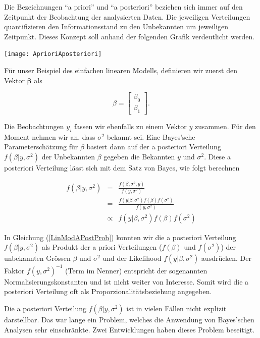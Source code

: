 \documentclass[]{book}
\begin{document}
Die Bezeichnungen ``a priori'' und ``a posteriori'' beziehen sich immer
auf den Zeitpunkt der Beobachtung der analysierten Daten. Die jeweiligen
Verteilungen quantifizieren den Informationsstand zu den Unbekannten um
jeweiligen Zeitpunkt. Dieses Konzept soll anhand der folgenden Grafik
verdeutlicht werden.

\begin{center}\texttt{[image: AprioriAposteriori]} \end{center}

Für unser Beispiel des einfachen linearen Modells, definieren wir zuerst
den Vektor \(\mathbf{\beta}\) als

\[\beta = \left[\begin{array}{c} \beta_0  \\  \beta_1 \end{array} \right].\]

Die Beobachtungen \(y_i\) fassen wir ebenfalls zu einem Vektor \(y\)
zusammen. Für den Moment nehmen wir an, dass \(\sigma^2\) bekannt sei.
Eine Bayes'sche Parameterschätzung für \(\beta\) basiert dann auf der a
posteriori Verteilung \(f(\beta | y, \sigma^2)\) der Unbekannten
\(\beta\) gegeben die Bekannten \(y\) und \(\sigma^2\). Diese a
posteriori Verteilung lässt sich mit dem Satz von Bayes, wie folgt
berechnen

\begin{eqnarray}
f(\beta | y, \sigma^2) & =       & \frac{f(\beta, \sigma^2, y)}{f(y, \sigma^2)} \nonumber \\
                       & =       & \frac{f(y | \beta, \sigma^2)f(\beta)f(\sigma^2)}{f(y, \sigma^2)} \nonumber \\
                       & \propto & f(y | \beta, \sigma^2)f(\beta)f(\sigma^2)
\label{LinModAPostProb}
\end{eqnarray}

In Gleichung (\ref{LinModAPostProb}) konnten wir die a posteriori
Verteilung \(f(\beta | y, \sigma^2)\) als Produkt der a priori
Verteilungen (\(f(\beta)\) und \(f(\sigma^2)\)) der unbekannten Grössen
\(\beta\) und \(\sigma^2\) und der Likelihood \(f(y | \beta, \sigma^2)\)
ausdrücken. Der Faktor \(f(y, \sigma^2)^{-1}\) (Term im Nenner)
entspricht der sogenannten Normalisierungskonstanten und ist nicht
weiter von Interesse. Somit wird die a posteriori Verteilung oft als
Proporzionalitätsbeziehung angegeben.

Die a posteriori Verteilung \(f(\beta | y, \sigma^2)\) ist in vielen
Fällen nicht explizit darstellbar. Das war lange ein Problem, welches
die Anwendung von Bayes'schen Analysen sehr einschränkte. Zwei
Entwicklungen haben dieses Problem beseitigt.
\end{document}
